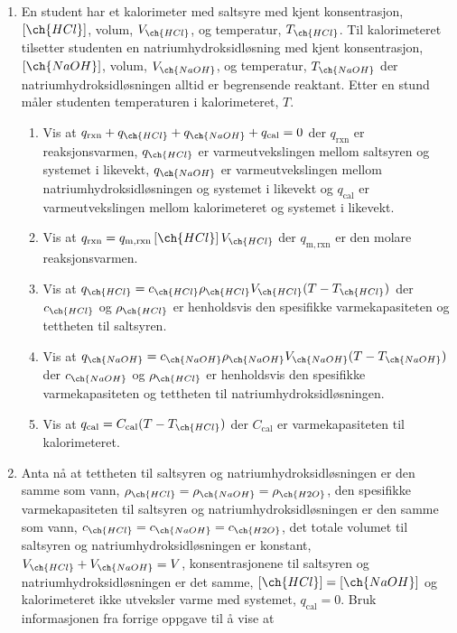 \begin{enumerate}[label=\alph*)]
		\item En student har et kalorimeter med saltsyre med kjent konsentrasjon, $\left[\ch{HCl}\right]$, volum, $V_{\ch{HCl}}$, og temperatur, $T_{\ch{HCl}}$.
		Til kalorimeteret tilsetter studenten en natriumhydroksidløsning med kjent konsentrasjon, $\left[\ch{NaOH}\right]$, volum, $V_{\ch{NaOH}}$, og temperatur, 	$T_{\ch{NaOH}}$ der natriumhydroksidløsningen alltid er begrensende reaktant.
		Etter en stund måler studenten temperaturen i kalorimeteret, $T$.
		\begin{enumerate}[label=\roman*)]
			\item Vis at $q_\mathrm{rxn} + q_{\ch{HCl}} + q_{\ch{NaOH}} + q_\mathrm{cal} = 0$ der $q_\mathrm{rxn}$ er reaksjonsvarmen, $q_{\ch{HCl}}$ er varmeutvekslingen mellom saltsyren og systemet i likevekt, $q_{\ch{NaOH}}$ er varmeutvekslingen mellom natriumhydroksidløsningen og systemet i likevekt og $q_\mathrm{cal}$ er varmeutvekslingen mellom kalorimeteret og systemet i likevekt.
			\item Vis at $q_\mathrm{rxn}=q_\mathrm{m, rxn} \left[\ch{HCl}\right] V_{\ch{HCl}}$ der $q_\mathrm{m, rxn}$ er den molare reaksjonsvarmen.
			\item Vis at $q_{\ch{HCl}}=c_{\ch{HCl}}\rho_{\ch{HCl}}V_{\ch{HCl}}(T - T_{\ch{HCl}})$ der $c_{\ch{HCl}}$ og $\rho_{\ch{HCl}}$ er henholdsvis den spesifikke varmekapasiteten og tettheten til saltsyren.
			\item Vis at $q_{\ch{NaOH}}=c_{\ch{NaOH}}\rho_{\ch{NaOH}}V_{\ch{NaOH}}(T - T_{\ch{NaOH}})$ der $c_{\ch{NaOH}}$ og $\rho_{\ch{HCl}}$ er henholdsvis den spesifikke varmekapasiteten og tettheten til natriumhydroksidløsningen.
			\item Vis at $q_\mathrm{cal}=C_\mathrm{cal}(T - T_{\ch{HCl}})$ der $C_\mathrm{cal}$ er varmekapasiteten til kalorimeteret.			
		\end{enumerate}
		\item Anta nå at tettheten til saltsyren og natriumhydroksidløsningen er den samme som vann, $\rho_{\ch{HCl}}=\rho_{\ch{NaOH}}=\rho_{\ch{H2O}}$, den spesifikke varmekapasiteten til saltsyren og natriumhydroksidløsningen er den samme som vann, $c_{\ch{HCl}}=c_{\ch{NaOH}}=c_{\ch{H2O}}$, det totale volumet til saltsyren og natriumhydroksidløsningen er konstant, $V_{\ch{HCl}} + V_{\ch{NaOH}} = V$, konsentrasjonene til saltsyren og natriumhydroksidløsningen er det samme, $\left[\ch{HCl}\right]=\left[\ch{NaOH}\right]$ og kalorimeteret ikke utveksler varme med systemet, $q_\mathrm{cal}=0$.
		Bruk informasjonen fra forrige oppgave til å vise at 

\end{enumerate}
